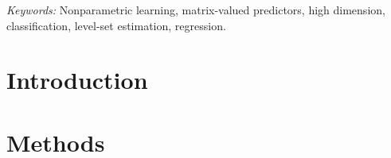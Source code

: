 \documentclass[12pt]{article}
\begin{document}
\noindent%
{\it Keywords:} Nonparametric learning, matrix-valued predictors, high dimension, classification, level-set estimation, regression.
\vfill

\newpage
{} %
\section{Introduction}
\label{sec:intro}


\section{Methods}
\label{sec:meth}
\end{document}
